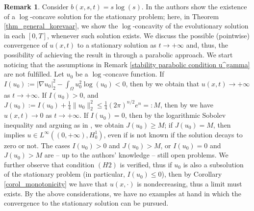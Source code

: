 \documentclass[11pt, reqno]{amsart}
\theoremstyle{definition}
\newtheorem{remark}[lemma]{Remark}
\numberwithin{equation}{section}
\def\norm#1{\|#1\|}
\newcommand{\tr}[1]{{\color{red} #1}}
\begin{document}
\begin{remark}\label{rem_converg_logarithm}
		Consider $b(x,s,t)=s \log(s)$. In \cite{Gallo-Mosconi-Squassina} the authors show the existence of a $\log$-concave solution for the stationary problem; here, in Theorem \ref{thm_general_korevaar}, we show the $\log$-concavity of the evolutionary solution in each $[0,T]$, whenever such solution exists. 
		We discuss the possible (pointwise) convergence of $u(x,t)$ to a stationary solution as $t\to +\infty$ and, thus, the possibility of achieving the result in \cite{Gallo-Mosconi-Squassina} through a parabolic approach. We start noticing that the assumptions in Remark \ref{stability parabolic condition u^gamma} are not fulfilled.
		Let $u_0$ be a $\log$-concave function. 
If $I(u_0):=|\nabla u_0|_2^2 - \int_{\Omega} u_0^2 \log(u_0) <0$, then by \cite[Theorem 1.1]{HAN2019} we obtain that $u(x,t) \to +\infty$ as $t \to +\infty$. 
If $I(u_0)>0$, and $J(u_0):=I(u_0)+\frac{1}{4} \norm{u_0}_2^2\leq \frac {1}{4} (2\pi)^{n/2} e^n=:M$, then by \cite[Theorems 1.1 and 1.2]{CLL15} we have $u(x,t) \to 0$ as $t \to +\infty$.
If $I(u_0)=0$, then by  the logarithmic Sobolev inequality and arguing as in \cite[Lemma 2.3]{wangwang2024}, we obtain $J(u_0) \geq M$; if $J(u_0)=M$, then \cite[Theorems 1.2]{CLL15} implies $u \in L^{\infty}((0,+\infty), H^1_0)$, even if is not known if the solution decays to zero or not.
The cases $I(u_0)>0$ and $J(u_0)>M$, or $I(u_0)=0$ and $J(u_0)> M$ are -- up to the authors' knowledge -- still open problems. 
		We further observe that condition \hyperlink{H2}{\( (H2) \)} is verified, thus if $u_0$ is also a subsolution of the stationary problem (in particular, $I(u_0) \leq 0$), then by Corollary \ref{corol_monotonicity} we have that $u(x, \cdot)$ is nondecreasing, thus a limit must exists.
By the above considerations, we have no examples at hand in which the convergence to the stationary solution can be pursued.


\end{remark}
\end{document}
